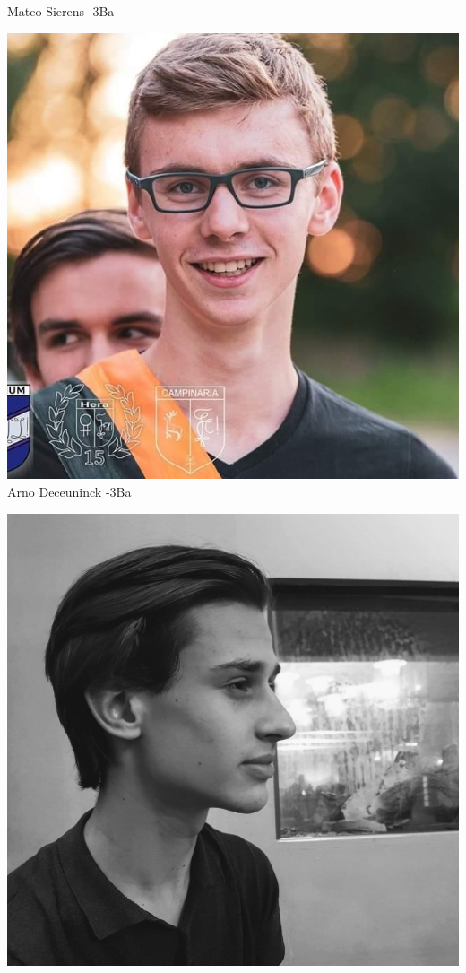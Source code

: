 \begin{frame}
\begin{minipage}{0.30\linewidth}
        \footnotesize Mateo Sierens -3Ba\strut%
    \end{minipage}
    \begin{minipage}{0.30\linewidth}%
        \centering%
        \noindent\includegraphics[width=\linewidth]{res/arno} \\%
        \footnotesize Arno Deceuninck -3Ba\strut%
    \end{minipage}  	
    \begin{minipage}{0.30\linewidth}%
        \centering%
		\includegraphics[width=\linewidth]{res/senne} \\%

\end{minipage}
\end{frame}
